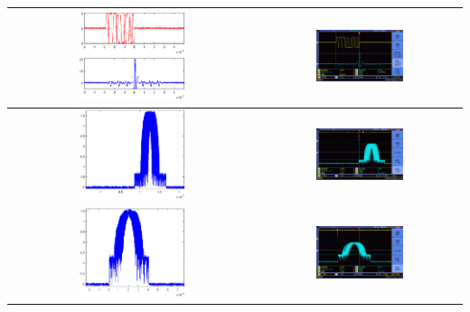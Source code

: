 \documentclass[12pt]{article}
\begin{document}
\begin{longtable}{|c|c|}
\includegraphics[width=0.45\textwidth]{rebuild/006}&\includegraphics[width=0.45\textwidth]{data/new/F0042TEK}\\ \hline
\includegraphics[width=0.45\textwidth]{rebuild/007}&\includegraphics[width=0.45\textwidth]{data/new2/F0010TEK}\\ \hline
\includegraphics[width=0.45\textwidth]{rebuild/008}&\includegraphics[width=0.45\textwidth]{data/new2/F0013TEK}\\ \hline
\end{longtable}
\end{document}
